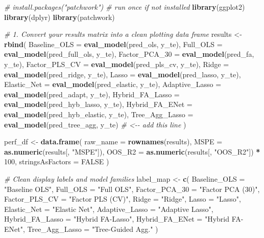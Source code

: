 \documentclass[
]{article}
\newenvironment{Shaded}{\begin{snugshade}}{\end{snugshade}}
\newcommand{\AttributeTok}[1]{\textcolor[rgb]{0.13,0.29,0.53}{#1}}
\newcommand{\CommentTok}[1]{\textcolor[rgb]{0.56,0.35,0.01}{\textit{#1}}}
\newcommand{\ConstantTok}[1]{\textcolor[rgb]{0.56,0.35,0.01}{#1}}
\newcommand{\DecValTok}[1]{\textcolor[rgb]{0.00,0.00,0.81}{#1}}
\newcommand{\FunctionTok}[1]{\textcolor[rgb]{0.13,0.29,0.53}{\textbf{#1}}}
\newcommand{\NormalTok}[1]{#1}
\newcommand{\OtherTok}[1]{\textcolor[rgb]{0.56,0.35,0.01}{#1}}
\newcommand{\SpecialCharTok}[1]{\textcolor[rgb]{0.81,0.36,0.00}{\textbf{#1}}}
\newcommand{\StringTok}[1]{\textcolor[rgb]{0.31,0.60,0.02}{#1}}
\begin{document}
\begin{Shaded}
\begin{Highlighting}[]
\CommentTok{\# install.packages("patchwork") \# run once if not installed}
\FunctionTok{library}\NormalTok{(ggplot2)}
\FunctionTok{library}\NormalTok{(dplyr)}
\FunctionTok{library}\NormalTok{(patchwork)}

\CommentTok{\# 1. Convert your \textasciigrave{}results\textasciigrave{} matrix into a clean plotting data frame}
\NormalTok{results }\OtherTok{\textless{}{-}} \FunctionTok{rbind}\NormalTok{(}
  \AttributeTok{Baseline\_OLS     =} \FunctionTok{eval\_model}\NormalTok{(pred\_ols,         y\_te),}
  \AttributeTok{Full\_OLS         =} \FunctionTok{eval\_model}\NormalTok{(pred\_full\_ols,    y\_te),}
  \AttributeTok{Factor\_PCA\_30    =} \FunctionTok{eval\_model}\NormalTok{(pred\_fa,          y\_te),}
  \AttributeTok{Factor\_PLS\_CV    =} \FunctionTok{eval\_model}\NormalTok{(pred\_pls\_cv,      y\_te),}
  \AttributeTok{Ridge            =} \FunctionTok{eval\_model}\NormalTok{(pred\_ridge,       y\_te),}
  \AttributeTok{Lasso            =} \FunctionTok{eval\_model}\NormalTok{(pred\_lasso,       y\_te),}
  \AttributeTok{Elastic\_Net      =} \FunctionTok{eval\_model}\NormalTok{(pred\_elastic,     y\_te),}
  \AttributeTok{Adaptive\_Lasso   =} \FunctionTok{eval\_model}\NormalTok{(pred\_adapt,       y\_te),}
  \AttributeTok{Hybrid\_FA\_Lasso  =} \FunctionTok{eval\_model}\NormalTok{(pred\_hyb\_lasso,   y\_te),}
  \AttributeTok{Hybrid\_FA\_ENet   =} \FunctionTok{eval\_model}\NormalTok{(pred\_hyb\_elastic, y\_te),}
  \AttributeTok{Tree\_Agg\_Lasso   =} \FunctionTok{eval\_model}\NormalTok{(pred\_tree\_agg,    y\_te)   }\CommentTok{\# \textless{}{-}{-} add this line}
\NormalTok{)}

\NormalTok{perf\_df }\OtherTok{\textless{}{-}} \FunctionTok{data.frame}\NormalTok{(}
  \AttributeTok{raw\_name =} \FunctionTok{rownames}\NormalTok{(results),}
  \AttributeTok{MSPE     =} \FunctionTok{as.numeric}\NormalTok{(results[, }\StringTok{"MSPE"}\NormalTok{]),}
  \AttributeTok{OOS\_R2   =} \FunctionTok{as.numeric}\NormalTok{(results[, }\StringTok{"OOS\_R2"}\NormalTok{]) }\SpecialCharTok{*} \DecValTok{100}\NormalTok{,}
  \AttributeTok{stringsAsFactors =} \ConstantTok{FALSE}
\NormalTok{)}

\CommentTok{\# Clean display labels and model families}
\NormalTok{label\_map }\OtherTok{\textless{}{-}} \FunctionTok{c}\NormalTok{(}
  \AttributeTok{Baseline\_OLS    =} \StringTok{"Baseline OLS"}\NormalTok{,}
  \AttributeTok{Full\_OLS        =} \StringTok{"Full OLS"}\NormalTok{,}
  \AttributeTok{Factor\_PCA\_30   =} \StringTok{"Factor PCA (30)"}\NormalTok{,}
  \AttributeTok{Factor\_PLS\_CV   =} \StringTok{"Factor PLS (CV)"}\NormalTok{,}
  \AttributeTok{Ridge           =} \StringTok{"Ridge"}\NormalTok{,}
  \AttributeTok{Lasso           =} \StringTok{"Lasso"}\NormalTok{,}
  \AttributeTok{Elastic\_Net     =} \StringTok{"Elastic Net"}\NormalTok{,}
  \AttributeTok{Adaptive\_Lasso  =} \StringTok{"Adaptive Lasso"}\NormalTok{,}
  \AttributeTok{Hybrid\_FA\_Lasso =} \StringTok{"Hybrid FA{-}Lasso"}\NormalTok{,}
  \AttributeTok{Hybrid\_FA\_ENet  =} \StringTok{"Hybrid FA{-}ENet"}\NormalTok{,}
  \AttributeTok{Tree\_Agg\_Lasso  =} \StringTok{"Tree{-}Guided Agg."}
\NormalTok{)}


\end{Highlighting}
\end{Shaded}
\end{document}
